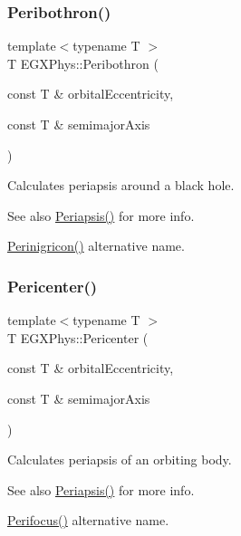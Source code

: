 \subsubsection{\texorpdfstring{Peribothron()}{Peribothron()}}
{\footnotesize\ttfamily template$<$typename T $>$ \\
T E\+G\+X\+Phys\+::\+Peribothron (\begin{DoxyParamCaption}\item[{const T \&}]{orbital\+Eccentricity,  }\item[{const T \&}]{semimajor\+Axis }\end{DoxyParamCaption})}



Calculates periapsis around a black hole. 

\begin{DoxySeeAlso}{See also}
\hyperlink{group___astrophysics_ga4414ac75539371ec874a3d25cad6c9fe}{Periapsis()} for more info. 

\hyperlink{group___astrophysics_ga99d86af90179994e17158b082c502fd4}{Perinigricon()} alternative name. 
\end{DoxySeeAlso}
\mbox{\label{group___astrophysics_gac4c419a87a5802cf6afc98f50792e99f}} 
\subsubsection{\texorpdfstring{Pericenter()}{Pericenter()}}
{\footnotesize\ttfamily template$<$typename T $>$ \\
T E\+G\+X\+Phys\+::\+Pericenter (\begin{DoxyParamCaption}\item[{const T \&}]{orbital\+Eccentricity,  }\item[{const T \&}]{semimajor\+Axis }\end{DoxyParamCaption})}



Calculates periapsis of an orbiting body. 

\begin{DoxySeeAlso}{See also}
\hyperlink{group___astrophysics_ga4414ac75539371ec874a3d25cad6c9fe}{Periapsis()} for more info. 

\hyperlink{group___astrophysics_gaff62669fb364a245cb85f9a91d8ea71f}{Perifocus()} alternative name. 
\end{DoxySeeAlso}
\mbox{\label{group___astrophysics_ga12b5e99aa2e3e7031ef6ce93060cf516}} 
